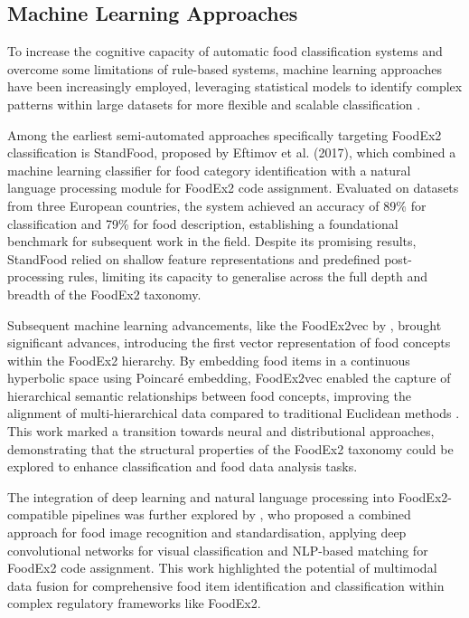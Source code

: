 \hypertarget{machine-learning-approaches}{%
\subsection{Machine Learning Approaches}\label{machine-learning-approaches}}

To increase the cognitive capacity of automatic food classification systems and overcome some limitations of rule-based systems, machine learning approaches have been increasingly employed, leveraging statistical models to identify complex patterns within large datasets for more flexible and scalable classification \parencite{n_n__misra_b6603190}.

Among the earliest semi-automated approaches specifically targeting FoodEx2 classification is StandFood, proposed by Eftimov et al. (2017), which combined a machine learning classifier for food category identification with a natural language processing module for FoodEx2 code assignment. Evaluated on datasets from three European countries, the system achieved an accuracy of 89\% for classification and 79\% for food description, establishing a foundational benchmark for subsequent work in the field. Despite its promising results, StandFood relied on shallow feature representations and predefined post-processing rules, limiting its capacity to generalise across the full depth and breadth of the FoodEx2 taxonomy.

Subsequent machine learning advancements, like the FoodEx2vec by \textcite{eftimov_foodex2vec_2020}, brought significant advances, introducing the first vector representation of food concepts within the FoodEx2 hierarchy. By embedding food items in a continuous hyperbolic space using Poincaré embedding, FoodEx2vec enabled the capture of hierarchical semantic relationships between food concepts, improving the alignment of multi-hierarchical data compared to traditional Euclidean methods \parencite{lorenzo_molfetta_47d7c4cd}. This work marked a transition towards neural and distributional approaches, demonstrating that the structural properties of the FoodEx2 taxonomy could be explored to enhance classification and food data analysis tasks.

The integration of deep learning and natural language processing into FoodEx2-compatible pipelines was further explored by \textcite{simon_mezgec_ec31e9e4}, who proposed a combined approach for food image recognition and standardisation, applying deep convolutional networks for visual classification and NLP-based matching for FoodEx2 code assignment. This work highlighted the potential of multimodal data fusion for comprehensive food item identification and classification within complex regulatory frameworks like FoodEx2.

